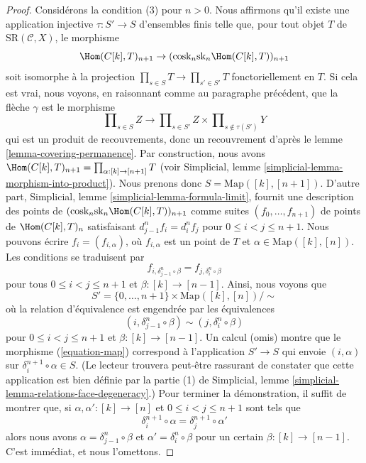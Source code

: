 \begin{proof}
\medskip\noindent
Considérons la condition (3) pour $n > 0$. Nous affirmons qu'il existe une
application injective $\tau : S' \to S$ d'ensembles finis telle que, pour tout
objet $T$ de $\text{SR}(\mathcal{C}, X)$, le morphisme
\begin{equation}
\label{equation-map}
\Hom(C[k], T)_{n + 1} \to
(\text{cosk}_n \text{sk}_n \Hom(C[k], T))_{n + 1}
\end{equation}
soit isomorphe à la projection $\prod_{s \in S} T \to \prod_{s' \in S'} T$
fonctoriellement en $T$. Si cela est vrai, nous voyons, en raisonnant comme au paragraphe
précédent, que la flèche $\gamma$ est le morphisme
$$
\prod\nolimits_{s \in S} Z
\longrightarrow
\prod\nolimits_{s \in S'} Z
\times
\prod\nolimits_{s \not\in \tau(S')} Y
$$
qui est un produit de recouvrements, donc un recouvrement d'après le
lemme \ref{lemma-covering-permanence}. Par construction, nous avons
$\Hom(C[k], T)_{n + 1} = \prod_{\alpha : [k] \to [n + 1]} T$
(voir Simplicial, lemme \ref{simplicial-lemma-morphism-into-product}).
Nous prenons donc $S = \text{Map}([k], [n + 1])$.
D'autre part, Simplicial, lemme \ref{simplicial-lemma-formula-limit},
fournit une description des points de
$(\text{cosk}_n \text{sk}_n \Hom(C[k], T))_{n + 1}$
comme suites $(f_0, \ldots, f_{n + 1})$ de points de $\Hom(C[k], T)_n$
satisfaisant $d^n_{j - 1} f_i = d^n_i f_j$ pour $0 \leq i < j \leq n + 1$.
Nous pouvons écrire $f_i = (f_{i, \alpha})$, où $f_{i, \alpha}$ est un point de $T$
et $\alpha \in \text{Map}([k], [n])$. Les conditions se traduisent par
$$
f_{i, \delta^n_{j - 1} \circ \beta} = f_{j, \delta_i^n \circ \beta}
$$
pour tous $0 \leq i < j \leq n + 1$ et $\beta : [k] \to [n - 1]$. Ainsi, nous
voyons que
$$
S' = \{0, \ldots, n + 1\} \times \text{Map}([k], [n]) / \sim
$$
où la relation d'équivalence est engendrée par les équivalences
$$
(i, \delta^n_{j - 1} \circ \beta) \sim (j, \delta_i^n \circ \beta)
$$
pour $0 \leq i < j \leq n + 1$ et $\beta : [k] \to [n - 1]$.
Un calcul (omis) montre que le morphisme (\ref{equation-map})
correspond à l'application $S' \to S$ qui envoie $(i, \alpha)$ sur
$\delta^{n + 1}_i \circ \alpha \in S$. (Le lecteur trouvera peut-être rassurant
de constater que cette application est bien définie par la partie (1) de
Simplicial, lemme \ref{simplicial-lemma-relations-face-degeneracy}.)
Pour terminer la démonstration, il suffit de montrer que, si
$\alpha, \alpha' : [k] \to [n]$ et $0 \leq i < j \leq n + 1$
sont tels que
$$
\delta^{n + 1}_i \circ \alpha = \delta^{n + 1}_j \circ \alpha'
$$
alors nous avons $\alpha = \delta^n_{j - 1} \circ \beta$
et $\alpha' = \delta_i^n \circ \beta$ pour un certain $\beta : [k] \to [n - 1]$.
C'est immédiat, et nous l'omettons.
\end{proof}

